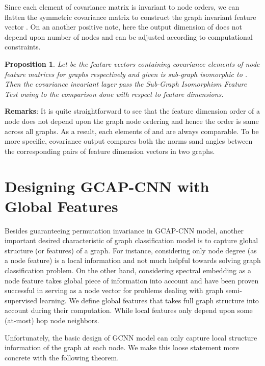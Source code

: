 \documentclass{article}
\newtheorem{prop}{Proposition}
\begin{document}
Since each element of covariance matrix is invariant to node orders, we can flatten the symmetric covariance matrix  to construct the graph invariant feature vector . On an  another positive note, here the output dimension of  does not depend upon  number of nodes and can be adjusted according to computational constraints.

\begin{prop}\label{prop:cov-isomorphic-test} 
Let  be the feature vectors containing covariance elements of  node feature matrices for graphs  respectively and given  is sub-graph isomorphic to . Then the covariance invariant layer \emph{pass} the Sub-Graph Isomorphism Feature Test  owing to the comparison done with respect to feature dimensions.
\end{prop}
\noindent\textbf{{Remarks}}: It is quite straightforward to see that the feature dimension order of a node  does not depend upon the graph node ordering and hence   the order is same across all    graphs. As a result, each elements of  and  are always comparable. To be more specific, covariance output compares both the norms sand angles between the corresponding pairs of feature dimension vectors in two graphs.



\section{Designing GCAP-CNN with Global Features}\label{sec:global_features}

Besides guaranteeing permutation invariance in GCAP-CNN model, another important desired characteristic of  graph classification model is to capture global structure (or features) of a graph.  For instance, considering only node degree (as a node feature) is a local  information and not much helpful towards solving graph classification problem. On the other hand, considering spectral embedding as a node feature  takes global  piece of information into account and have been proven successful  in serving as a node vector for problems dealing with graph semi-supervised learning.  
We define global features that takes full graph structure into account during   their computation. While local features only depend upon some (at-most) hop node  neighbors.

Unfortunately, the basic design of GCNN model   can   only capture local structure information of the graph at each node. We make this loose statement more concrete with the following theorem.
\end{document}
